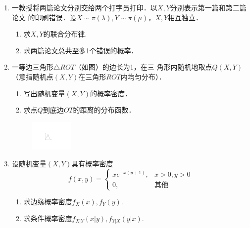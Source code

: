 \documentclass[10pt,a4paper]{article}
\begin{document}
\begin{enumerate}
    \item 一教授将两篇论文分别交给两个打字员打印．以$X,Y$分别表示第一篇和第二篇论文
    的印刷错误．设$X\sim \pi(\lambda),Y\sim \pi(\mu)$，$X,Y$相互独立．
    \begin{enumerate}
        \item 求$X,Y$的联合分布律.
        \item 求两篇论文总共至多1个错误的概率．
    \end{enumerate}
    \clearpage





    \item 一等边三角形$\triangle ROT$（如图）的边长为1，在三
    角形内随机地取点$Q(X,Y)$ （意指随机点$(X,Y)$在三角形$ROT$内均匀分布）．
    \begin{enumerate}
        \item 写出随机变量$(X,Y)$的概率密度．
        \item 求点$Q$到底边$OT$的距离的分布函数．
    \end{enumerate}
    \begin{figure}[H]
        \flushright 
        \includegraphics[width=0.2\textwidth]{25.pdf}
    \end{figure}
    \vspace{-0.5cm}
    \clearpage





    \item 设随机变量$(X,Y)$具有概率密度
    $$f(x,y)=\left\{\begin{array}{ll}
        xe^{-x(y+1)}, & x>0,y>0\\
        0, & \mbox{其他} 
    \end{array}\right.$$
    \begin{enumerate}
        \item 求边缘概率密度$f_X(x),f_Y(y)$.
        \item 求条件概率密度$f_{X|Y}(x|y),f_{Y|X}(y|x)$.
    \end{enumerate}
    \clearpage



\end{enumerate}
\end{document}
